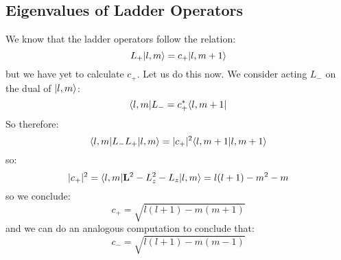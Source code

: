 \subsection{Eigenvalues of Ladder Operators}
We know that the ladder operators follow the relation:
\begin{equation}
    L_+\lvert l, m \rangle = c_+\lvert l, m+1 \rangle
\end{equation}
but we have yet to calculate $c_+$. Let us do this now. We consider acting $L_-$ on the dual of $\lvert l, m \rangle$:
\begin{equation}
    \langle l, m \rvert L_- = c_+^*\langle l, m+1 \rvert
\end{equation}
So therefore:
\begin{equation}
    \langle l, m \rvert L_-L_+\lvert l, m \rangle = \lvert c_+ \rvert^2\langle l, m+1 \lvert l, m+1 \rangle
\end{equation}
so:
\begin{equation}
    \lvert c_+ \rvert^2 = \langle l, m \rvert\mathbf{L}^2 - L_z^2 - L_z\lvert l, m \rangle = l(l+1) - m^2 - m
\end{equation}
so we conclude:
\begin{equation}
    c_+ = \sqrt{l(l+1) - m(m+1)}
\end{equation}
and we can do an analogous computation to conclude that:
\begin{equation}
    c_- = \sqrt{l(l+1) - m(m-1)}
\end{equation}

